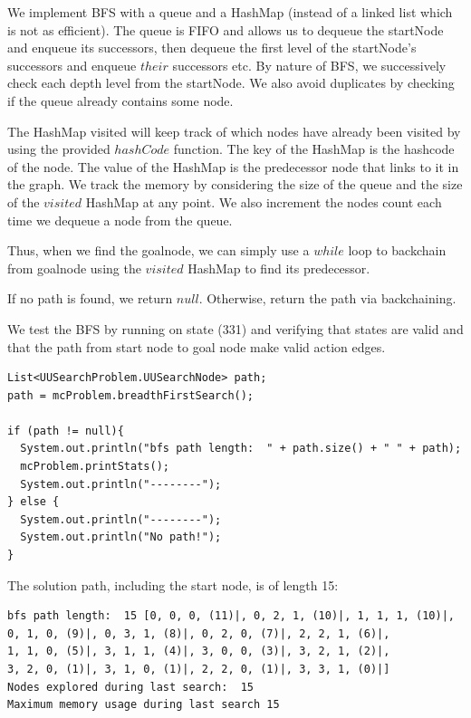 \documentclass[a4paper]{report}
\begin{document}
We implement BFS with a queue and a HashMap (instead of a linked list which is not as efficient). 
The queue is FIFO and allows us to dequeue the startNode and enqueue its successors, then dequeue the
first level of the startNode's successors and enqueue $their$ successors etc. By nature of BFS, we 
successively check each depth level from the startNode. We also avoid duplicates by checking if
the queue already contains some node. 

The HashMap visited will keep track of which nodes have already been 
visited by using the provided $hashCode$ function. The key of the HashMap is the hashcode of the node. 
The value of the HashMap is the predecessor node that links to it in the graph. We track the memory by considering the size of the queue
and the size of the $visited$ HashMap at any point. We also increment the nodes count each time we dequeue a node
from the queue. 

Thus, when we find the goalnode, we can simply use a 
$while$ loop to backchain from goalnode using the $visited$ HashMap to find its predecessor. 

If no path is found, we return $null$. Otherwise, return the path via backchaining. 

We test the BFS by running on state (331) and verifying that states are valid and that the path from start node to
goal node make valid action edges. 

\begin{lstlisting}
List<UUSearchProblem.UUSearchNode> path;
path = mcProblem.breadthFirstSearch();	

if (path != null){
  System.out.println("bfs path length:  " + path.size() + " " + path);
  mcProblem.printStats();
  System.out.println("--------");
} else {
  System.out.println("--------");
  System.out.println("No path!");
}
\end{lstlisting}

The solution path, including the start node, is of length 15:

\begin{lstlisting}
bfs path length:  15 [0, 0, 0, (11)|, 0, 2, 1, (10)|, 1, 1, 1, (10)|,
0, 1, 0, (9)|, 0, 3, 1, (8)|, 0, 2, 0, (7)|, 2, 2, 1, (6)|, 
1, 1, 0, (5)|, 3, 1, 1, (4)|, 3, 0, 0, (3)|, 3, 2, 1, (2)|, 
3, 2, 0, (1)|, 3, 1, 0, (1)|, 2, 2, 0, (1)|, 3, 3, 1, (0)|]
Nodes explored during last search:  15
Maximum memory usage during last search 15
\end{lstlisting}
\end{document}
